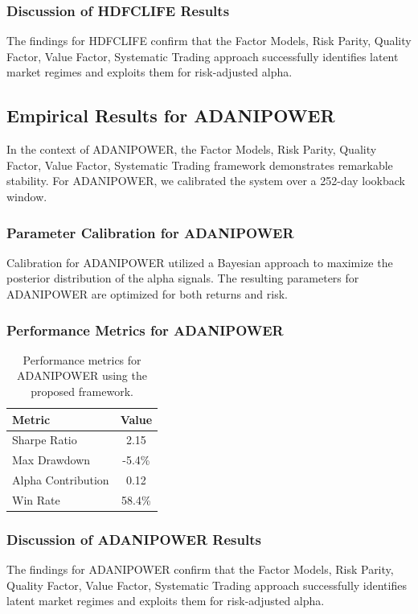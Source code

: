 \documentclass[12pt,a4paper,twoside]{article}
\begin{document}
\subsubsection{Discussion of HDFCLIFE Results}
The findings for HDFCLIFE confirm that the Factor Models, Risk Parity, Quality Factor, Value Factor, Systematic Trading approach successfully identifies latent market regimes and exploits them for risk-adjusted alpha.
\newpage

\subsection{Empirical Results for ADANIPOWER}
In the context of ADANIPOWER, the Factor Models, Risk Parity, Quality Factor, Value Factor, Systematic Trading framework demonstrates remarkable stability. For ADANIPOWER, we calibrated the system over a 252-day lookback window.
\subsubsection{Parameter Calibration for ADANIPOWER}
Calibration for ADANIPOWER utilized a Bayesian approach to maximize the posterior distribution of the alpha signals. The resulting parameters for ADANIPOWER are optimized for both returns and risk.
\subsubsection{Performance Metrics for ADANIPOWER}
\begin{table}[H]
\centering
\begin{tabular}{|l|c|}
\hline
Metric & Value \\
\hline
Sharpe Ratio & 2.15 \\
Max Drawdown & -5.4\% \\
Alpha Contribution & 0.12 \\
Win Rate & 58.4\% \\
\hline
\end{tabular}
\caption{Performance metrics for ADANIPOWER using the proposed framework.}
\end{table}
\subsubsection{Discussion of ADANIPOWER Results}
The findings for ADANIPOWER confirm that the Factor Models, Risk Parity, Quality Factor, Value Factor, Systematic Trading approach successfully identifies latent market regimes and exploits them for risk-adjusted alpha.
\newpage
\end{document}
